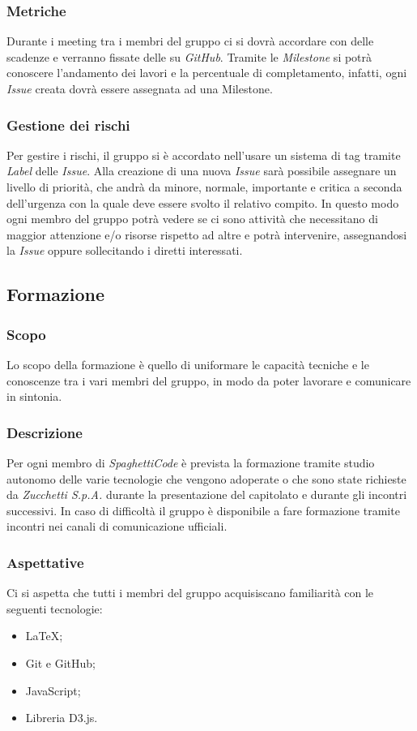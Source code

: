 \subsubsection{Metriche}

Durante i meeting tra i membri del gruppo ci si dovrà accordare con delle scadenze e verranno fissate delle 
 su \emph{GitHub}. Tramite le \emph{Milestone} si potrà conoscere l'andamento dei lavori e la 
percentuale di completamento, infatti, ogni \emph{Issue} creata dovrà essere assegnata ad una Milestone. 

\subsubsection{Gestione dei rischi}

Per gestire i rischi, il gruppo si è accordato nell'usare un sistema di tag tramite \emph{Label} delle \emph{Issue}. 
Alla creazione di una nuova \emph{Issue} sarà possibile assegnare un livello di priorità, che andrà da minore, normale, 
importante e critica a seconda dell'urgenza con la quale deve essere svolto il relativo compito. In questo modo ogni 
membro del gruppo potrà vedere se ci sono attività che necessitano di maggior attenzione e/o risorse rispetto ad altre 
e potrà intervenire, assegnandosi la \emph{Issue} oppure sollecitando i diretti interessati.

\subsection{Formazione}

\subsubsection{Scopo}

Lo scopo della formazione è quello di uniformare le capacità tecniche e le conoscenze tra i vari membri del gruppo, in 
modo da poter lavorare e comunicare in sintonia.

\subsubsection{Descrizione}

Per ogni membro di \emph{SpaghettiCode} è prevista la formazione tramite studio autonomo delle varie tecnologie che 
vengono adoperate o che sono state richieste da \emph{Zucchetti S.p.A.} durante la presentazione del capitolato e 
durante gli incontri successivi. In caso di difficoltà il gruppo è disponibile a fare formazione tramite incontri nei 
canali di comunicazione ufficiali.

\subsubsection{Aspettative}

Ci si aspetta che tutti i membri del gruppo acquisiscano familiarità con le seguenti tecnologie:
\begin{itemize}
    \item \LaTeX;
    \item Git e GitHub;
    \item JavaScript;
    \item Libreria D3.js.
\end{itemize}